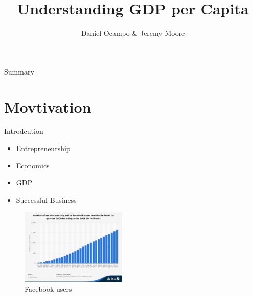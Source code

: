 \documentclass[handout,t]{beamer}
\title[Final Project]{Understanding GDP per Capita }
\date{}
\author{Daniel Ocampo \& Jeremy Moore}
\begin{document}

\frame{\titlepage}
\section[]{}
\begin{frame}{Summary}
  \tableofcontents
\end{frame}


\section{Movtivation}
\begin{frame}{Introdcution}
\begin{itemize}
\item Entrepreneurship
\item Economics 
\item GDP
\item Successful Business 
\end{itemize}

\begin{figure}
    \centering
    \includegraphics[width = 0.45\textwidth]{facebook}
    \caption{Facebook users}
  \end{figure}



\end{frame}

\end{document}
